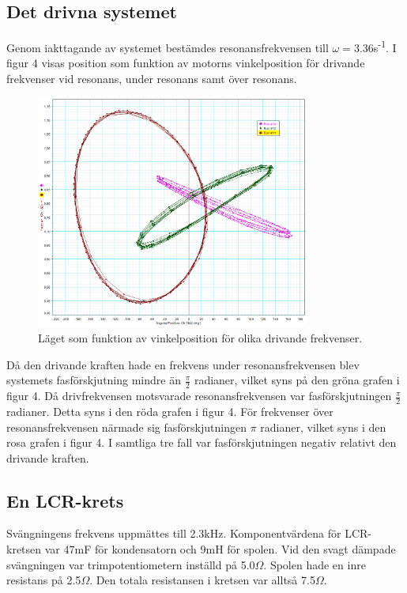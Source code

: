 \documentclass[a4paper,10pt]{article}
\begin{document}
\subsection{Det drivna systemet}
Genom iakttagande av systemet bestämdes resonansfrekvensen till $\omega=3.36$s\textsuperscript{-1}. I figur 4 visas position som funktion av motorns vinkelposition för drivande frekvenser vid resonans, under resonans samt över resonans.
\begin{figure}[H]
	\centering
	\includegraphics[width=0.8\textwidth]{../bilder/pos_vs_ang_uppg2b.png}
	\caption{Läget som funktion av vinkelposition för olika drivande frekvenser.}
\end{figure}
Då den drivande kraften hade en frekvens under resonansfrekvensen blev systemets fasförskjutning mindre än $\frac{\pi}{2}$ radianer, vilket syns på den gröna grafen i figur 4. Då drivfrekvensen motsvarade resonansfrekvensen var fasförskjutningen $\frac{\pi}{2}$ radianer. Detta syns i den röda grafen i figur 4. För frekvenser över resonansfrekvensen närmade sig fasförskjutningen $\pi$ radianer, vilket syns i den rosa grafen i figur 4. I samtliga tre fall var fasförskjutningen negativ relativt den drivande kraften.

\subsection{En LCR-krets}
Svängningens frekvens uppmättes till 2.3kHz. Komponentvärdena för LCR-kretsen var 47mF för kondensatorn och 9mH för spolen. Vid den svagt dämpade svängningen var trimpotentiometern inställd på 5.0$\Omega$. Spolen hade en inre resistans på 2.5$\Omega$. Den totala resistansen i kretsen var alltså 7.5$\Omega$.
\end{document}
